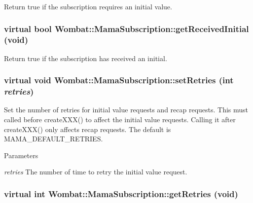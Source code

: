 Return true if the subscription requires an initial value. \hypertarget{classWombat_1_1MamaSubscription_a421a096d393f93dd73cdeca5f2b047cc}{
\subsubsection[{getReceivedInitial}]{\setlength{\rightskip}{0pt plus 5cm}virtual bool Wombat::MamaSubscription::getReceivedInitial (void)}}
\label{classWombat_1_1MamaSubscription_a421a096d393f93dd73cdeca5f2b047cc}


Return true if the subscription has received an initial. \hypertarget{classWombat_1_1MamaSubscription_ac6928358bc84c88edef730cd8f8f0f18}{
\subsubsection[{setRetries}]{\setlength{\rightskip}{0pt plus 5cm}virtual void Wombat::MamaSubscription::setRetries (int {\em retries})}}
\label{classWombat_1_1MamaSubscription_ac6928358bc84c88edef730cd8f8f0f18}


Set the number of retries for initial value requests and recap requests. This must called before createXXX() to affect the initial value requests. Calling it after createXXX() only affects recap requests. The default is MAMA\_\-DEFAULT\_\-RETRIES.


\begin{DoxyParams}{Parameters}
\item[{\em retries}]The number of time to retry the initial value request. \end{DoxyParams}
\hypertarget{classWombat_1_1MamaSubscription_a09f887c5c0768110e58c65143979dbf5}{
\subsubsection[{getRetries}]{\setlength{\rightskip}{0pt plus 5cm}virtual int Wombat::MamaSubscription::getRetries (void)}}
\label{classWombat_1_1MamaSubscription_a09f887c5c0768110e58c65143979dbf5}



